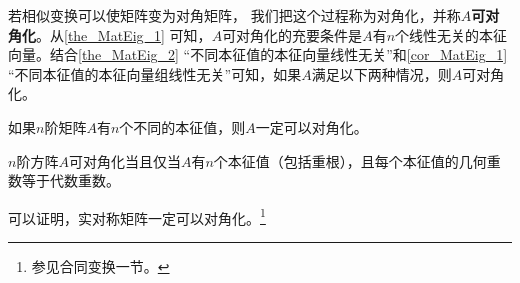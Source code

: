 若相似变换可以使矩阵变为对角矩阵， 我们把这个过程称为对角化，并称$A$\textbf{可对角化}。从\autoref{the_MatEig_1} 可知，$A$可对角化的充要条件是$A$有$n$个线性无关的本征向量。结合\autoref{the_MatEig_2} “不同本征值的本征向量线性无关”和\autoref{cor_MatEig_1} “不同本征值的本征向量组线性无关”可知，如果$A$满足以下两种情况，则$A$可对角化。
\begin{corollary}{}
如果$n$阶矩阵$A$有$n$个不同的本征值，则$A$一定可以对角化。
\end{corollary}
\begin{corollary}{}
$n$阶方阵$A$可对角化当且仅当$A$有$n$个本征值（包括重根），且每个本征值的几何重数等于代数重数。
\end{corollary}



可以证明，实对称矩阵一定可以对角化。\footnote{参见合同变换一节。}

